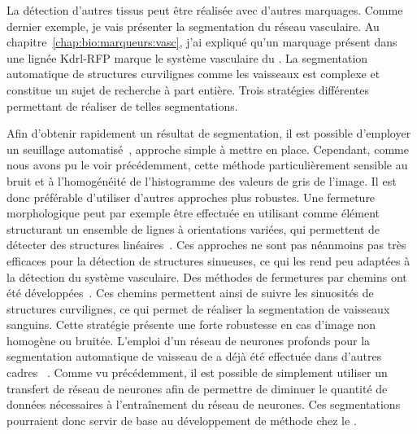 \documentclass[\main/main.tex]{subfiles}
\begin{document}
%
La détection d'autres tissus peut être réalisée avec d'autres marquages. Comme dernier exemple, je vais présenter la segmentation du réseau vasculaire.
Au chapitre~\ref{chap:bio:marqueurs:vasc}, j'ai expliqué qu'un marquage présent dans une lignée Kdrl-RFP marque le système vasculaire du \pz{}.
%
La segmentation automatique de structures curvilignes comme les vaisseaux est complexe et constitue un sujet de recherche à part entière. Trois stratégies différentes permettant de réaliser de telles segmentations.

%
Afin d'obtenir rapidement un résultat de segmentation, il est possible d'employer un seuillage automatisé~\cite{kugler_2019}, approche simple à mettre en place.
%
Cependant, comme nous avons pu le voir précédemment, cette méthode particulièrement sensible au bruit et à l'homogénéité de l'histogramme des valeurs de gris de l'image. Il est donc préférable d'utiliser d'autres approches plus robustes. Une fermeture morphologique peut par exemple être effectuée en utilisant comme élément structurant un ensemble de lignes à orientations variées, qui permettent de détecter des structures linéaires~\cite{Soille_2001}. Ces approches ne sont pas néanmoins pas très efficaces pour la détection de structures sinueuses, ce qui les rend peu adaptées à la détection du système vasculaire.
%
Des méthodes de fermetures par chemins ont été développées~\cite{talbot_2007,merveille_2018}. Ces chemins permettent ainsi de suivre les sinuosités de structures curvilignes, ce qui permet de réaliser la segmentation de vaisseaux sanguins. Cette stratégie présente une forte robustesse en cas d'image non homogène ou bruitée.
%
L'emploi d'un réseau de neurones profonds pour la segmentation automatique de vaisseau de \pz{} a déjà été effectuée dans d'autres cadres ~\cite{zhang_2019a, daetwyler_2019}.
%
Comme vu précédemment, il est possible de simplement utiliser un transfert de réseau de neurones afin de permettre de diminuer le quantité de données nécessaires à l'entraînement du réseau de neurones. Ces segmentations pourraient donc servir de base au développement de méthode chez le \pz{}.
\end{document}
